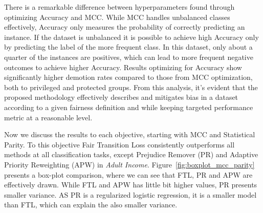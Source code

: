 There is a remarkable difference between hyperparameters found through optimizing Accuracy and MCC. While MCC handles unbalanced classes effectively, Accuracy only measures the probability of correctly predicting an instance. If the dataset is unbalanced it is possible to achieve high Accuracy only by predicting the label of the more frequent class. In this dataset, only about a quarter of the instances are positives, which can lead to more frequent negative outcomes to achieve higher Accuracy. Results optimizing for Accuracy show significantly higher demotion rates compared to those from MCC optimization, both to privileged and protected groups. From this analysis, it's evident that the proposed methodology effectively describes and mitigates bias in a dataset according to a given fairness definition and while keeping targeted performance metric at a reasonable level.

Now we discuss the results to each objective, starting with MCC and Statistical Parity. To this objective Fair Transition Loss consistently outperforms all methods at all classification tasks, except Prejudice Remover (PR) and Adaptive Priority Reweighting (APW) in \textit{Adult Income}. Figure~\ref{fig:boxplot_mcc_parity} presents a box-plot comparison, where we can see that FTL, PR and APW are effectively drawn. While FTL and APW has little bit higher values, PR presents smaller variance. AS PR is a regularized logistic regression, it is a smaller model than FTL, which can explain the also smaller variance.

